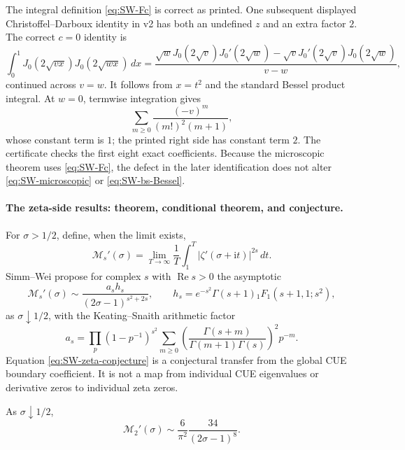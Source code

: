 The integral definition \eqref{eq:SW-Fc} is correct as printed.  One subsequent displayed
Christoffel--Darboux identity in v2 has both an undefined $z$ and an extra factor $2$.  The
correct $c=0$ identity is
\begin{equation}
 \int_0^1J_0(2\sqrt{vx})J_0(2\sqrt{wx})\,dx
 =\frac{\sqrt wJ_0(2\sqrt v)J_0'(2\sqrt w)
       -\sqrt vJ_0'(2\sqrt v)J_0(2\sqrt w)}{v-w},
 \label{eq:SW-correct-Bessel-CD}
\end{equation}
continued across $v=w$.  It follows from $x=t^2$ and the standard Bessel product integral.
At $w=0$, termwise integration gives
\begin{equation}
 \sum_{m\geq0}\frac{(-v)^m}{(m!)^2(m+1)},
\end{equation}
whose constant term is $1$; the printed right side has constant term $2$.  The certificate
checks the first eight exact coefficients.  Because the microscopic theorem uses
\eqref{eq:SW-Fc}, the defect in the later identification does not alter
\eqref{eq:SW-microscopic} or \eqref{eq:SW-bs-Bessel}.

\paragraph{The zeta-side results: theorem, conditional theorem, and conjecture.}
For $\sigma>1/2$, define, when the limit exists,
\begin{equation}
 \mathcal M_s'(\sigma)=\lim_{T\to\infty}\frac1T
 \int_1^T|\zeta'(\sigma+\mathrm it)|^{2s}\,dt.
 \label{eq:SW-zeta-mean}
\end{equation}
Simm--Wei propose for complex $s$ with $\operatorname{Re}s>0$ the asymptotic
\begin{equation}
 \mathcal M_s'(\sigma)\sim
 \frac{a_sh_s}{(2\sigma-1)^{s^2+2s}},\qquad
 h_s=e^{-s^2}\Gamma(s+1){}_1F_1(s+1,1;s^2),
 \label{eq:SW-zeta-conjecture}
\end{equation}
as $\sigma\downarrow1/2$, with the Keating--Snaith arithmetic factor
\begin{equation}
 a_s=\prod_p(1-p^{-1})^{s^2}
 \sum_{m\geq0}\left(\frac{\Gamma(s+m)}{\Gamma(m+1)\Gamma(s)}\right)^2p^{-m}.
 \label{eq:SW-arithmetic-factor}
\end{equation}
Equation \eqref{eq:SW-zeta-conjecture} is a conjectural transfer from the global CUE boundary
coefficient.  It is not a map from individual CUE eigenvalues or derivative zeros to
individual zeta zeros.

\begin{theorem}
\label{thm:SW-zeta-fourth}
As $\sigma\downarrow1/2$,
\begin{equation}
 \mathcal M_2'(\sigma)\sim\frac6{\pi^2}\frac{34}{(2\sigma-1)^8}.
 \label{eq:SW-zeta-fourth}
\end{equation}
\end{theorem}

